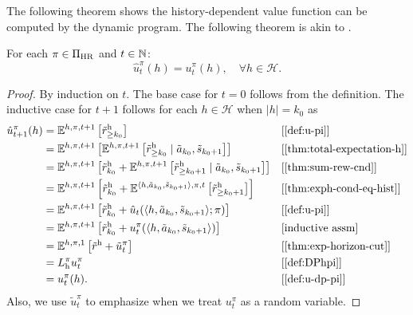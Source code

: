 The following theorem shows the history-dependent value function can be computed by the dynamic program. The following theorem is akin to \citep[theorem~4.2.1]{Puterman2005}.
\begin{theorem} \label{thm:dph-correct-vf}
For each $\pi\in \Pi_{\mathrm{HR}}$ and $t\in \mathbb{N}$:
  \[
    \hat{u}^{\pi}_t(h)
    =
    u^{\pi}_t(h), \quad \forall h\in \mathcal{H}.
  \]
\end{theorem}
\begin{proof}
By induction on $t$. The base case for $t=0$ follows from the definition. The inductive case for $t + 1$ follows for each $h\in \mathcal{H}$ when $|h| = k_0$ as
{\allowdisplaybreaks
\begin{align*}
\hat{u}_{t+1}^{\pi}(h)
&= \E^{h, \pi, t+1} \left[ \rew_{\ge k_0}  \right] && \why{\cref{def:u-pi}}\\
&= \E^{h, \pi, t+1} \left[  \E^{h, \pi, t+1} \left[ \rew_{\ge k_0} \mid \tilde{a}_{k_0}, \tilde{s}_{k_0+1} \right] \right]  && \why{\cref{thm:total-expectation-h}} \\
&= \E^{h, \pi, t+1} \left[\rew_{k_0} +  \E^{h, \pi, t+1} \left[  \rew_{\ge k_0+1} \mid \tilde{a}_{k_0}, \tilde{s}_{k_0+1} \right] \right] && \why{\cref{thm:sum-rew-cnd}} \\
&= \E^{h, \pi, t+1} \left[\rew_{k_0} +  \E^{\langle h,\tilde{a}_{k_0},\tilde{s}_{k_0+1}\rangle, \pi, t} \left[ \rew_{\ge k_0+1} \right]\right] && \why{\cref{thm:exph-cond-eq-hist}} \\
&= \E^{h, \pi, t+1} \left[\rew_{k_0} +  \hat{u}_t(\langle h,\tilde{a}_{k_0},\tilde{s}_{k_0+1}\rangle; \pi) \right] && \why{\cref{def:u-pi}} \\
&= \E^{h, \pi, t+1} \left[\rew_{k_0} +  u^{\pi}_t(\langle h,\tilde{a}_{k_0},\tilde{s}_{k_0+1}\rangle) \right] && \why{inductive assm} \\
&= \E^{h, \pi, 1} \left[\rew +  \tilde{u}^{\pi}_t \right] && \why{\cref{thm:exp-horizon-cut}} \\
&= L_{\mathrm{h}}^{\pi} u_t^{\pi} && \why{\cref{def:DPhpi}} \\
&= u^{\pi}_t(h). && \why{\cref{def:u-dp-pi}}
\end{align*}
}
Also, we use $\tilde{u}_t^{\pi}$ to emphasize when we treat $u^{\pi}_t$ as a random variable. 
\end{proof}

